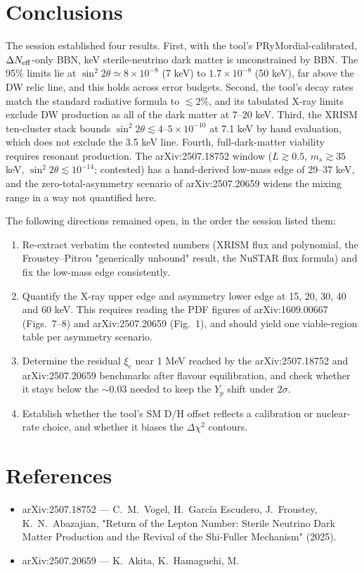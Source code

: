 \documentclass[11pt,a4paper]{article}
\begin{document}
\section{Conclusions}
The session established four results. First, with the tool's PRyMordial-calibrated, $\Delta N_{\rm eff}$-only BBN, keV sterile-neutrino dark matter is unconstrained by BBN. The 95\% limits lie at $\sin^2 2\theta\simeq8\times10^{-8}$ (7 keV) to $1.7\times10^{-8}$ (50 keV), far above the DW relic line, and this holds across error budgets. Second, the tool's decay rates match the standard radiative formula to $\lesssim2\%$, and its tabulated X-ray limits exclude DW production as all of the dark matter at 7--20 keV. Third, the XRISM ten-cluster stack bounds $\sin^2 2\theta\lesssim4$--$5\times10^{-10}$ at 7.1 keV by hand evaluation, which does not exclude the 3.5 keV line. Fourth, full-dark-matter viability requires resonant production. The arXiv:2507.18752 window ($L\gtrsim0.5$, $m_s\gtrsim35$ keV, $\sin^2 2\theta\lesssim10^{-14}$; contested) has a hand-derived low-mass edge of 29--37 keV, and the zero-total-asymmetry scenario of arXiv:2507.20659 widens the mixing range in a way not quantified here.

The following directions remained open, in the order the session listed them:
\begin{enumerate}
\item Re-extract verbatim the contested numbers (XRISM flux and polynomial, the Froustey--Pitrou "generically unbound" result, the NuSTAR flux formula) and fix the low-mass edge consistently.
\item Quantify the X-ray upper edge and asymmetry lower edge at 15, 20, 30, 40 and 60 keV. This requires reading the PDF figures of arXiv:1609.00667 (Figs.~7--8) and arXiv:2507.20659 (Fig.~1), and should yield one viable-region table per asymmetry scenario.
\item Determine the residual $\xi_e$ near 1 MeV reached by the arXiv:2507.18752 and arXiv:2507.20659 benchmarks after flavour equilibration, and check whether it stays below the $\sim0.03$ needed to keep the $Y_p$ shift under $2\sigma$.
\item Establish whether the tool's SM D/H offset reflects a calibration or nuclear-rate choice, and whether it biases the $\Delta\chi^2$ contours.
\end{enumerate}

\section*{References}
\begin{itemize}
\item arXiv:2507.18752 --- C.~M.~Vogel, H.~García Escudero, J.~Froustey, K.~N.~Abazajian, "Return of the Lepton Number: Sterile Neutrino Dark Matter Production and the Revival of the Shi-Fuller Mechanism" (2025).
\item arXiv:2507.20659 --- K.~Akita, K.~Hamaguchi, M.~
\end{itemize}
\end{document}
